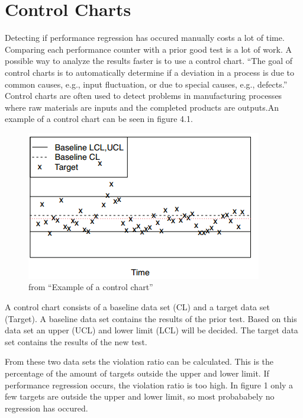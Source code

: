 \section{Control Charts}
Detecting if performance regression has occured manually costs a lot of time. Comparing each performance counter with a prior good test is a lot of work. A possible way to analyze the results faster is to use a control chart.
``The goal of control charts is to automatically determine if a deviation in a process is due to common causes, e.g., input fluctuation, or due to special causes, e.g., defects.'' \cite{nguyen2012using} Control charts are often used to detect problems in manufacturing processes where raw materials are inputs and the completed products are outputs.An example of a control chart can be seen in figure 4.1. \

\begin{figure}[h]
\begin{center}
  \includegraphics[scale=0.7]{Figures/controlchart.png}
\end{center}
  \caption{from ``Example of a control chart''\cite{nguyen2012using}}

\end{figure}


A control chart consists of a baseline data set (CL) and a target data set (Target). A baseline data set contains the results of the prior test. Based on this data set an upper (UCL) and lower limit (LCL) will be decided. The target data set contains the results of the new test.

From these two data sets the violation ratio can be calculated. This is the percentage of the amount of targets outside the upper and lower limit. If performance regression occurs, the violation ratio is too high. In figure 1 only a few targets are outside the upper and lower limit, so most probababely no regression has occured.

